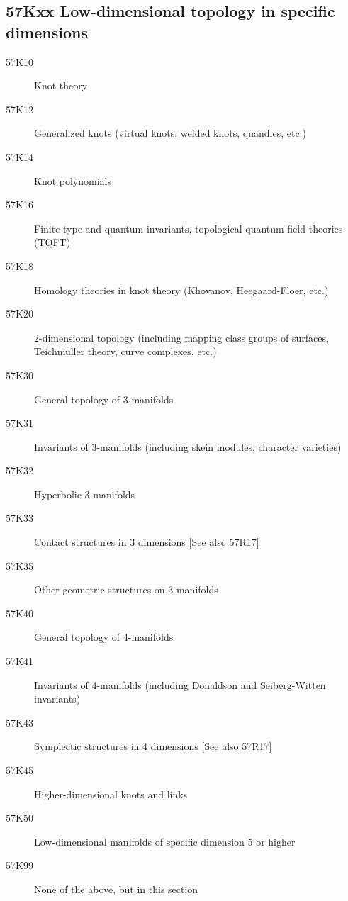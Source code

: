 \documentclass[letterpaper]{article}
\begin{document}
\subsection*{57Kxx Low-dimensional topology in specific dimensions }\label{57Kxx}
\begin{description} 
\item [57K10]\label{57K10} Knot theory
\item [57K12]\label{57K12} Generalized knots (virtual knots, welded knots, quandles, etc.)
\item [57K14]\label{57K14} Knot polynomials
\item [57K16]\label{57K16} Finite-type and quantum invariants, topological quantum field theories (TQFT)
\item [57K18]\label{57K18} Homology theories in knot theory (Khovanov, Heegaard-Floer, etc.)
\item [57K20]\label{57K20} 2-dimensional topology (including mapping class groups of surfaces, Teichmüller theory, curve complexes, etc.)
\item [57K30]\label{57K30} General topology of 3-manifolds
\item [57K31]\label{57K31} Invariants of 3-manifolds (including skein modules, character varieties)
\item [57K32]\label{57K32} Hyperbolic 3-manifolds
\item [57K33]\label{57K33} Contact structures in 3 dimensions [See also \hyperref[57R17]{57R17}]
\item [57K35]\label{57K35} Other geometric structures on 3-manifolds
\item [57K40]\label{57K40} General topology of 4-manifolds
\item [57K41]\label{57K41} Invariants of 4-manifolds (including Donaldson and Seiberg-Witten invariants)
\item [57K43]\label{57K43} Symplectic structures in 4 dimensions [See also \hyperref[57R17]{57R17}]
\item [57K45]\label{57K45} Higher-dimensional knots and links 
\item [57K50]\label{57K50} Low-dimensional manifolds of specific dimension 5 or higher
\item [57K99]\label{57K99} None of the above, but in this section 
\end{description}
\end{document}
